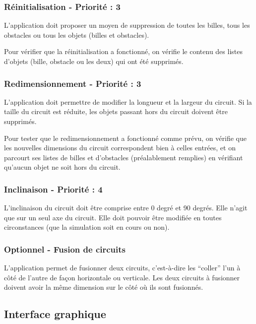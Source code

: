 \documentclass{report}
\begin{document}
\subsubsection{Réinitialisation - Priorité : 3}

L’application doit proposer un moyen de suppression de toutes les billes, tous les obstacles ou tous les objets (billes et obstacles).

Pour vérifier que la réinitialisation a fonctionné, on vérifie le contenu des listes d’objets (bille, obstacle ou les deux) qui ont été supprimés.


\subsubsection{Redimensionnement - Priorité : 3}

L’application doit permettre de modifier la longueur et la largeur du circuit. Si la taille du circuit est réduite, les objets passant hors du circuit doivent être supprimés.

Pour tester que le redimensionnement a fonctionné comme prévu, on vérifie que les nouvelles dimensions du circuit correspondent bien à celles entrées, et on parcourt ses listes de billes et d’obstacles (préalablement remplies) en vérifiant qu’aucun objet ne soit hors du circuit.


\subsubsection{Inclinaison - Priorité : 4}

L’inclinaison du circuit doit être comprise entre 0 degré et 90 degrés. Elle n’agit que sur un seul axe du circuit. Elle doit pouvoir être modifiée en toutes circonstances (que la simulation soit en cours ou non).

\subsubsection{Optionnel - Fusion de circuits}

L’application permet de fusionner deux circuits, c’est-à-dire les “coller” l’un à côté de l’autre de façon horizontale ou verticale. Les deux circuits à fusionner doivent avoir la même dimension sur le côté où ils sont fusionnés.

\subsection{Interface graphique}
\end{document}
